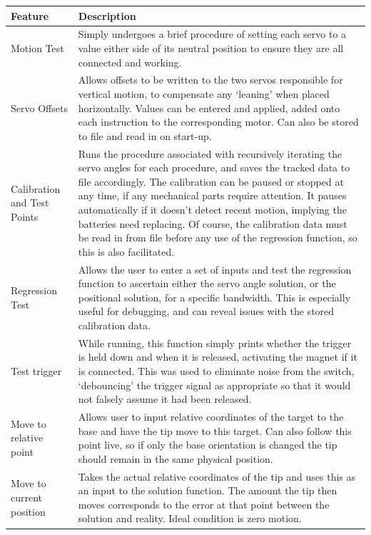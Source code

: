 \documentclass[11pt]{article}
\begin{document}
\begin{center}
\label{table:keyFeatures}
\begin{tabularx}{0.95\textwidth}{|p{10em}|X|}
\hline
\textbf{Feature} & \textbf{Description}
\\
\hline
Motion Test & Simply undergoes a brief procedure of setting each servo to a value either side of its neutral position to ensure they are all connected and working.
\\
\hline
Servo Offsets & Allows offsets to be written to the two servos responsible for vertical motion, to compensate any `leaning' when placed horizontally. Values can be entered and applied, added onto each instruction to the corresponding motor. Can also be stored to file and read in on start-up.
\\
\hline
Calibration and Test Points & Runs the procedure associated with recursively iterating the servo angles for each procedure, and saves the tracked data to file accordingly. The calibration can be paused or stopped at any time, if any mechanical parts require attention. It pauses automatically if it doesn't detect recent motion, implying the batteries need replacing. Of course, the calibration data must be read in from file before any use of the regression function, so this is also facilitated.
\\
\hline
Regression Test & Allows the user to enter a set of inputs and test the regression function to ascertain either the servo angle solution, or the positional solution, for a specific bandwidth. This is especially useful for debugging, and can reveal issues with the stored calibration data.
\\
\hline
Test trigger & While running, this function simply prints whether the trigger is held down and when it is released, activating the magnet if it is connected. This was used to eliminate noise from the switch, `debouncing' the trigger signal as appropriate so that it would not falsely assume it had been released.
\\
\hline
Move to relative point & Allows user to input relative coordinates of the target to the base and have the tip move to this target. Can also follow this point live, so if only the base orientation is changed the tip should remain in the same physical position.
\\
\hline
Move to current \newline position & Takes the actual relative coordinates of the tip and uses this as an input to the solution function. The amount the tip then moves corresponds to the error at that point between the solution and reality. Ideal condition is zero motion.

\end{tabularx}
\end{center}
\end{document}

